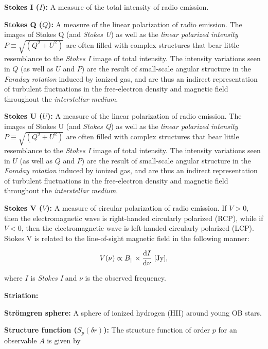 \documentclass[a4paper,10pt]{article}
\begin{document}
{\noindent}\textbf{Stokes I ($I$):} A measure of the total intensity of radio emission.

{\noindent}\textbf{Stokes Q ($Q$):} A measure of the linear polarization of radio emission. The images of Stokes Q (and \textit{Stokes U}) as well as the \textit{linear polarized intensity} $P\equiv\sqrt{(Q^2+U^2)}$ are often filled with complex structures that bear little resemblance to the \textit{Stokes I} image of total intensity. The intensity variations seen in $Q$ (as well as $U$ and $P$) are the result of small-scale angular structure in the \textit{Faraday rotation} induced by ionized gas, and are thus an indirect representation of turbulent fluctuations in the free-electron density and magnetic field throughout the \textit{interstellar medium}.

{\noindent}\textbf{Stokes U ($U$):} A measure of the linear polarization of radio emission. The images of Stokes U (and \textit{Stokes Q}) as well as the \textit{linear polarized intensity} $P\equiv\sqrt{(Q^2+U^2)}$ are often filled with complex structures that bear little resemblance to the \textit{Stokes I} image of total intensity. The intensity variations seen in $U$ (as well as $Q$ and $P$) are the result of small-scale angular structure in the \textit{Faraday rotation} induced by ionized gas, and are thus an indirect representation of turbulent fluctuations in the free-electron density and magnetic field throughout the \textit{interstellar medium}.

{\noindent}\textbf{Stokes V ($V$):} A measure of circular polarization of radio emission. If $V>0$, then the electromagnetic wave is right-handed circularly polarized (RCP), while if $V<0$, then the electromagnetic wave is left-handed circularly polarized (LCP). Stokes V is related to the line-of-sight magnetic field in the following manner:

\begin{align*}
    V(\nu) \propto B_\parallel \times \frac{\mathrm{d}I}{\mathrm{d}\nu} ~ [{\rm Jy}],
\end{align*}

{\noindent}where $I$ is \textit{Stokes I} and $\nu$ is the observed frequency.

{\noindent}\textbf{Striation:} 

{\noindent}\textbf{Str\"{o}mgren sphere:} A sphere of ionized hydrogen (HII) around young OB stars.

{\noindent}\textbf{Structure function ($S_p(\delta r)$):} The structure function of order $p$ for an observable $A$ is given by
\end{document}
